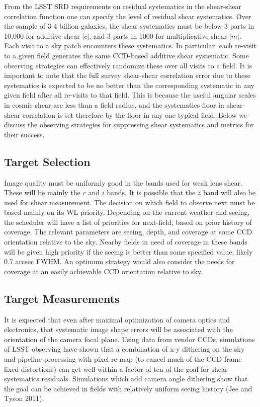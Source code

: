 From the LSST SRD requirements on residual systematics in the shear-shear
correlation function one can specify the level of residual shear systematics.
Over the sample of 3-4 billion galaxies, the shear systematics must be below 3
parts in 10,000 for additive shear $|c|$, and 3 parts in 1000 for multiplicative
shear $|m|$. Each visit to a sky patch encounters these systematics. In
particular, each re-visit to a given field generates the same CCD-based additive
shear systematic.  Some observing strategies can effectively randomize these
over all visits to a field.  It is important to note that the full survey
shear-shear correlation error due to these systematics is expected to be no
better than the corresponding systematic in any given field after all re-visits
to that field.  This is because the  useful angular scales in cosmic shear are
less than a field radius, and the systematics floor  in shear-shear correlation
is set therefore by the floor in any one typical field.  Below we discuss the
observing strategies for suppressing shear systematics and metrics for their
success.

\subsection{Target Selection}

Image quality must be uniformly good in the bands used for weak lens shear.
These will be mainly the $r$ and $i$ bands. It is possible that the $z$ band
will also be used for shear measurement.  The decision on which field to observe
next must be based mainly on its WL priority.  Depending on the current weather
and seeing, the scheduler will have a list of priorities for next-field, based
on prior history of coverage.  The relevant parameters are seeing, depth, and
coverage at some CCD orientation relative to the sky.  Nearby fields in need of
coverage in these bands will be given high priority if the seeing is better than
some specified value, likely 0.7 arcsec FWHM. An optimum strategy would also
consider the needs for coverage at an easily achievable CCD orientation relative
to sky.


\subsection{Target Measurements}

It is expected that even after maximal optimization of camera optics and
electronics, that systematic image shape errors will be associated with the
orientation of the camera focal plane.  Using data from vendor CCDs, simulations
of LSST observing have shown that a combination of x-y dithering on the sky and
pipeline processing with pixel re-map (to cancel much of the CCD frame fixed
distortions) can get well within a factor of ten of the goal for shear
systematics residuals.  Simulations which add camera angle dithering show that
the goal can be achieved in fields with relatively uniform seeing history (Jee
and Tyson 2011).

